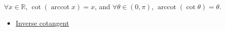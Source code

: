 \begin{remark*}
$\forall x\in\mathbb{R}$, $\cot(\operatorname{arccot} x)=x$, and
$\forall \theta\in(0,\pi)$, $\operatorname{arccot}(\cot\theta)=\theta$.
\end{remark*}
\begin{dependencies}
\begin{itemize}
  \item \hyperref[def:inverse-cotangent]{Inverse cotangent}
\end{itemize}
\end{dependencies}
